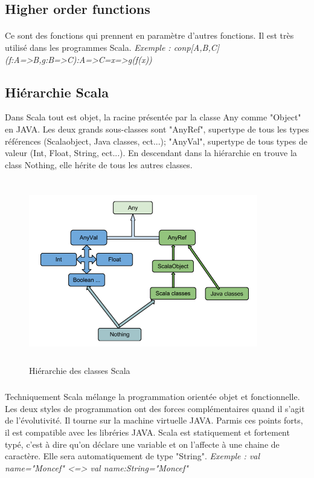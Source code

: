 \subsection{Higher order functions}
\paragraph{}
Ce sont des fonctions qui prennent en paramètre d'autres fonctions.
Il est très utilisé dans les programmes Scala.
\newline
\textit{Exemple : conp[A,B,C](f:A=>B,g:B=>C):A=>C=x=>g(f(x))}
\subsection{Hiérarchie Scala}
Dans Scala tout est objet, la racine présentée par la classe Any comme "Object" en JAVA.
Les deux grands sous-classes sont "AnyRef", supertype de tous les types références (Scalaobject, Java classes, ect...);
"AnyVal", supertype de tous types de valeur (Int, Float, String, ect...).
En descendant dans la hiérarchie en trouve la class Nothing, elle hérite de tous les autres classes.

\begin{figure}[H]
        \centering
                \centering
                \includegraphics[width=10cm,height=8cm]{Hierarchie.png}
                \caption{Hiérarchie des classes Scala}
                \label{fig:Hiérarchie des classes Scala}
       
\end{figure}
\subparagraph{}
Techniquement Scala mélange la programmation orientée objet et fonctionnelle. Les deux styles de programmation ont des forces complémentaires quand il s'agit de l'évolutivité. Il tourne sur la machine virtuelle JAVA. Parmis ces points forts, il est compatible avec les libréries JAVA.
Scala est statiquement et fortement typé, c'est à dire qu'on déclare une variable et on l'affecte à une chaine de caractère. Elle sera automatiquement de type "String".
\newline
\textit{Exemple : val name="Moncef" <=> val name:String="Moncef"}

